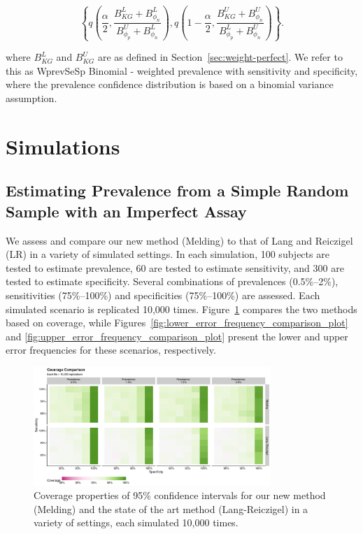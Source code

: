 \documentclass[AMA,STIX1COL]{WileyNJD-v2}
\begin{document}
\begin{equation}
    \left\{ q \left( \frac{\alpha}{2}, \frac{B_{KG}^L + B_{\phi_n}^L }{B_{\phi_p}^U + B_{\phi_n}^L }  \right),  q \left( 1 - \frac{\alpha}{2}, \frac{B_{KG}^U + B_{\phi_n}^U}{B_{\phi_p}^L + B_{\phi_n}^U}  \right) \right\}.
\end{equation}

where \( B_{KG}^L \) and \( B_{KG}^U \) are as defined in Section~\ref{sec:weight-perfect}.
We refer to this as WprevSeSp Binomial - weighted prevalence with sensitivity and specificity, where the prevalence confidence distribution is based on a binomial variance assumption.

\section{Simulations}

\subsection{Estimating Prevalence from a Simple Random Sample with an Imperfect Assay}

We assess and compare our new method (Melding) to that of Lang and Reiczigel (LR) in a variety of simulated settings.
In each simulation, 100 subjects are tested to estimate prevalence, 60 are tested to estimate sensitivity, and 300 are tested to estimate specificity.
Several combinations of prevalences (0.5\%--2\%), sensitivities (75\%--100\%) and specificities (75\%--100\%) are assessed.
Each simulated scenario is replicated 10,000 times.
Figure~\ref{fig:coverage_comparison_plot} compares the two methods based on coverage, while Figures~\ref{fig:lower_error_frequency_comparison_plot} and \ref{fig:upper_error_frequency_comparison_plot} present the lower and upper error frequencies for these scenarios, respectively.

\begin{figure}
    \centering
    \includegraphics[width=0.8\textwidth]{figures/simple_coverage_comparison_plot.pdf}
    \caption{Coverage properties of 95\% confidence intervals for our new method (Melding) and the state of the art method (Lang-Reiczigel) in a variety of settings, each simulated 10,000 times.}
    \label{fig:coverage_comparison_plot}
\end{figure}
\end{document}
